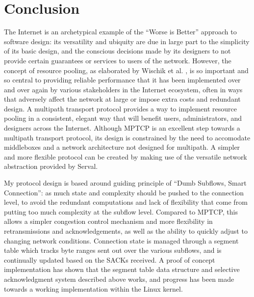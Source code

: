 \section{Conclusion}
\label{sec:concl}

The Internet is an archetypical example of the ``Worse is Better'' approach to software design: its versatility and ubiquity are due in large part to the simplicity of its basic design, and the conscious decisions made by its designers to not provide certain guarantees or services to users of the network. However, the concept of resource pooling, as elaborated by Wischik et al. \cite{wischik2008resource}, is so important and so central to providing reliable performance that it has been implemented over and over again by various stakeholders in the Internet ecosystem, often in ways that adversely affect the network at large or impose extra costs and redundant design. A multipath transport protocol provides a way to implement resource pooling in a consistent, elegant way that will benefit users, administrators, and designers across the Internet. Although MPTCP is an excellent step towards a multipath transport protocol, its design is constrained by the need to accomodate middleboxes and a network architecture not designed for multipath. A simpler and more flexible protocol can be created by making use of the versatile network abstraction provided by Serval.

My protocol design is based around guiding principle of ``Dumb Subflows, Smart Connection'': as much state and complexity should be pushed to the connection level, to avoid the redundant computations and lack of flexibility that come from putting too much complexity at the subflow level. Compared to MPTCP, this allows a simpler congestion control mechanism and more flexibility in retransmissions and acknowledgements, as well as the ability to quickly adjust to changing network conditions. Connection state is managed through a segment table which tracks byte ranges sent out over the various subflows, and is continually updated based on the SACKs received. A proof of concept implementation has shown that the segment table data structure and selective acknowledgment system described above works, and progress has been made towards a working implementation within the Linux kernel.

